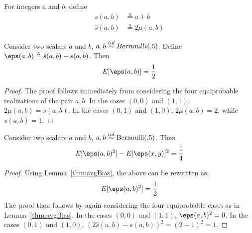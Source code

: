 \begin{definition}
For integers $a$ and $b$, define
\begin{align}
    s(a, b) &\triangleq a + b \\
    \hat{s}(a, b) &\triangleq 2 \mu(a, b)
\end{align}
\end{definition}

\begin{lemma} \label{thm:avgBias}
Consider two scalars $a$ and $b$, $a, b \stackrel{iid}{\sim} Bernoulli(.5)$. Define $\eps(a, b) \triangleq \hat{s}(a, b) - s(a, b)$. Then
\[
    E[\eps(a, b)] = \frac{1}{2}
\]
\end{lemma}
\begin{proof} The proof follows immediately from considering the four equiprobable realizations of the pair $a, b$. In the cases $(0, 0)$ and $(1, 1)$, $2\mu(a, b) = s(a, b)$. In the cases $(0, 1)$ and $(1, 0)$, $2 \mu(a, b) = 2$, while $s(a, b) = 1$.
\end{proof}





\begin{lemma}
Consider two scalars $a$ and $b$, $a, b \stackrel{iid}{\sim} \text{Bernoulli}(.5)$. Then
\[
    E[\eps(a, b)^2] - E[\eps(x, y)]^2 = \frac{1}{4}
\]
\end{lemma}
\begin{proof} Using Lemma~\ref{thm:avgBias}, the above can be rewritten as:
\[
    E[\eps(a, b)^2] = \frac{1}{2}
\]
The proof then follows by again considering the four equiprobable cases as in Lemma~\ref{thm:avgBias}. In the cases $(0, 0)$ and $(1, 1)$, $\eps(a, b)^2 = 0$. In the cases $(0, 1)$ and $(1, 0)$, $(2 \hat{s}(a, b) - s(a, b))^2 = (2 - 1)^2 = 1$.
\end{proof}

